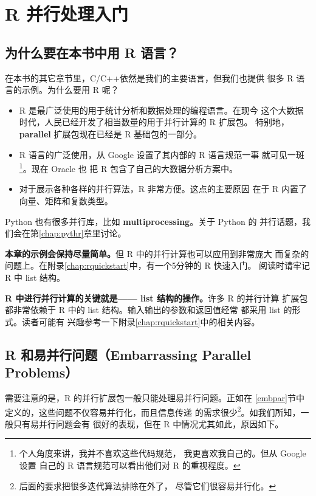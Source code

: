 
\chapter{R 并行处理入门}
\label{chap:r}

\section{为什么要在本书中用 R 语言？}

在本书的其它章节里，C/C++依然是我们的主要语言，但我们也提供
很多 R 语言的示例。为什么要用 R 呢？

\begin{itemize}

\item R 是最广泛使用的用于统计分析和数据处理的编程语言。在现今
这个大数据时代，人民已经开发了相当数量的用于并行计算的 R 扩展包。
特别地，{\bf parallel} 扩展包现在已经是 R 基础包的一部分。

\item R 语言的广泛使用，从 Google 设置了其内部的 R 语言规范一事
就可见一斑\footnote{个人角度来讲，我并不喜欢这些代码规范，
我更喜欢我自己的。但从 Google 设置
自己的 R 语言规范可以看出他们对 R 的重视程度。}。现在 Oracle 也
把 R 包含了自己的大数据分析方案中。

\item 对于展示各种各样的并行算法，R 非常方便。这点的主要原因
在于 R 内置了向量、矩阵和复数类型。

\end{itemize}

Python 也有很多并行库，比如 {\bf multiprocessing}。关于 Python 的
并行话题，我们会在第\ref{chap:pythr}章里讨论。

{\bf 本章的示例会保持尽量简单。}但 R 中的并行计算也可以应用到非常庞大
而复杂的问题上。在附录\ref{chap:rquickstart}中，有一个5分钟的 R 快速入门。
阅读时请牢记 R 中 list 结构。

{\bf R 中进行并行计算的关键就是—— list 结构的操作。}许多 R 的并行计算
扩展包都非常依赖于 R 中的 list 结构。输入输出的参数和返回值经常
都采用 list 的形式。读者可能有
兴趣参考一下附录\ref{chap:rquickstart}中的相关内容。

\section{R 和易并行问题（Embarrassing Parallel Problems）}

需要注意的是，R 的并行扩展包一般只能处理易并行问题。正如在
\ref{embpar}节中定义的，这些问题不仅容易并行化，而且信息传递
的需求很少\footnote{后面的要求把很多迭代算法排除在外了，
尽管它们很容易并行化。}。如我们所知，一般只有易并行问题会有
很好的表现，但在 R 中情况尤其如此，原因如下。

